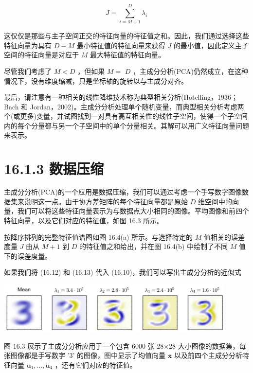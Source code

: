 \documentclass[10pt]{report}
\begin{document}
\[
J = \mathop{\sum }\limits_{{i = M + 1}}^{D}{\lambda }_{i} \tag{16.18}
\]

这仅仅是那些与主子空间正交的特征向量的特征值之和。因此，我们通过选择这些特征向量为具有 \(D - M\) 最小特征值的特征向量来获得 \(J\) 的最小值，因此定义主子空间的特征向量是对应于 \(M\) 最大特征值的特征向量。

尽管我们考虑了 \(M < D\) ，但如果 \(M =\)  \(D\) ，主成分分析(PCA)仍然成立，在这种情况下，没有维度缩减，只是坐标轴的旋转以与主成分对齐。

最后，请注意有一种相关的线性降维技术称为典型相关分析(Hotelling，1936；Bach 和 Jordan，2002)。主成分分析处理单个随机变量，而典型相关分析考虑两个(或更多)变量，并试图找到一对具有高互相关性的线性子空间，使得一个子空间内的每个分量都与另一个子空间中的单个分量相关。其解可以用广义特征向量问题来表示。

\section*{16.1.3 数据压缩}

主成分分析(PCA)的一个应用是数据压缩，我们可以通过考虑一个手写数字图像数据集来说明这一点。由于协方差矩阵的每个特征向量都是原始 \(D\) 维空间中的向量，我们可以将这些特征向量表示为与数据点大小相同的图像。平均图像和前四个特征向量，以及它们对应的特征值，如图 16.3 所示。

按降序排列的完整特征值谱图如图 16.4(a) 所示。与选择特定的 \(M\) 值相关的误差度量 \(J\) 由从 \(M + 1\) 到 \(D\) 的特征值之和给出，并在图 16.4(b) 中绘制了不同 \(M\) 值下的误差度量。

如果我们将 (16.12) 和 (16.13) 代入 (16.10)，我们可以写出主成分分析的近似式

\begin{center}
\includegraphics[max width=0.9\textwidth]{images/0194e279-9b28-703a-88f4-c3ac21e2010d_521_312_449_1229_270_0.jpg}
\end{center}
\hspace*{3em} 

图 16.3 展示了主成分分析应用于一个包含 6000 张 28×28 大小图像的数据集，每张图像都是手写数字 '3' 的图像，图中显示了均值向量 \(\overline{\mathbf{x}}\) 以及前四个主成分分析特征向量 \({\mathbf{u}}_{1},\ldots ,{\mathbf{u}}_{4}\) ，还有它们对应的特征值。
\end{document}
